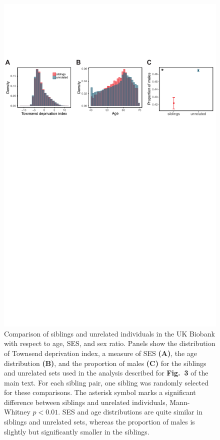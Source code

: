 \documentclass[hidelinks, 12pt]{article}
\begin{document}
\pagebreak

\begin{figure}[h]
\centering
\includegraphics[width=\textwidth]{./supp_figures/sibs_unrel_compare1.pdf}
\caption[Comparison of siblings and unrelated individuals in the UK Biobank with respect to age, SES, and sex ratio]{\small Comparison of siblings and unrelated individuals in the UK Biobank with respect to age, SES, and sex ratio. Panels show the distribution of Townsend deprivation index, a measure of SES {\bf (A)}, the age distribution {\bf (B)}, and the proportion of males {\bf (C)} for the siblings and unrelated sets used in the analysis described for {\bf Fig.~3} of the main text. For each sibling pair, one sibling was randomly selected for these comparisons. The asterisk symbol marks a significant difference between siblings and unrelated individuals, Mann-Whitney $p<0.01$. SES and age distributions are quite similar in siblings and unrelated sets, whereas the proportion of males is slightly but significantly smaller in the siblings.}
\end{figure}
\end{document}
